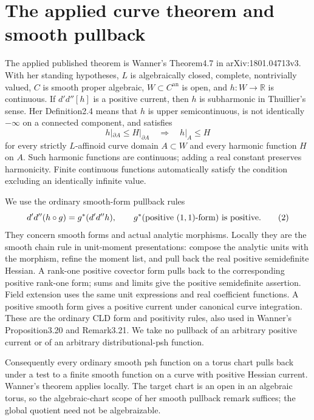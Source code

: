 \documentclass[11pt]{article}
\newcommand{\DD}{d'd''}
\begin{document}
\section{The applied curve theorem and smooth pullback}
The applied published theorem is Wanner's Theorem4.7 in
arXiv:1801.04713v3. With her standing hypotheses, $L$ is algebraically
closed, complete, nontrivially valued, $C$ is smooth proper algebraic,
$W\subset C^{\mathrm{an}}$ is open, and $h:W\to\mathbb R$ is continuous.
If $\DD[h]$ is a positive current, then $h$ is subharmonic in Thuillier's
sense. Her Definition2.4 means that $h$ is upper semicontinuous, is not
identically $-\infty$ on a connected component, and satisfies
\[
 h|_{\partial A}\le H|_{\partial A}\quad\Longrightarrow\quad h|_A\le H
 \tag{1}
\]
for every strictly $L$-affinoid curve domain $A\subset W$ and every
harmonic function $H$ on $A$. Such harmonic functions are continuous;
adding a real constant preserves harmonicity.
Finite continuous functions automatically satisfy the condition excluding
an identically infinite value.

We use the ordinary smooth-form pullback rules
\[
 \DD(h\circ g)=g^*(\DD h),\qquad
 g^*(\hbox{positive $(1,1)$-form})\ \hbox{is positive}. \tag{2}
\]
They concern smooth forms and actual analytic morphisms. Locally they are
the smooth chain rule in unit-moment presentations: compose the analytic
units with the morphism, refine the moment list, and pull back the real
positive semidefinite Hessian. A rank-one positive covector form pulls
back to the corresponding positive rank-one form; sums and limits give
the positive semidefinite assertion. Field extension uses the same unit
expressions and real coefficient functions. A positive smooth form gives
a positive current under canonical curve integration. These are the
ordinary CLD form and positivity rules, also used in Wanner's
Proposition3.20 and Remark3.21. We take no pullback of an arbitrary
positive current or of an arbitrary distributional-psh function.

Consequently every ordinary smooth psh function on a torus chart pulls
back under a test to a finite smooth function on a curve with positive
Hessian current. Wanner's theorem applies locally. The target chart is an
open in an algebraic torus, so the algebraic-chart scope of her smooth
pullback remark suffices; the global quotient need not be algebraizable.
\end{document}

